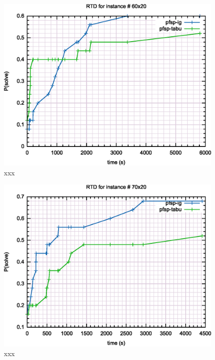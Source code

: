 \begin{figure}[H]
	\centering
	\includegraphics[width=\textwidth]{fig/qrd/60x20}
	\caption{xxx}
\end{figure}

\begin{figure}[H]
	\centering
	\includegraphics[width=\textwidth]{fig/qrd/70x20}
	\caption{xxx}
\end{figure}

